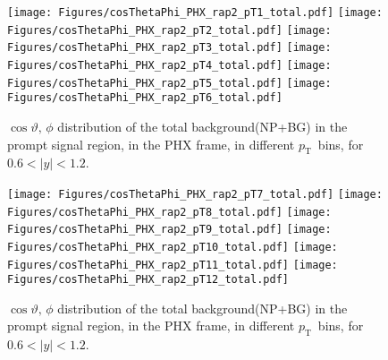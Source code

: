 \documentclass[12pt]{article}
\newcommand{\pt}{$p_{\mathrm{T}}$}
\begin{document}
\begin{figure}[htbp]
\centering
\texttt{[image: Figures/cosThetaPhi\_PHX\_rap2\_pT1\_total.pdf]}
\texttt{[image: Figures/cosThetaPhi\_PHX\_rap2\_pT2\_total.pdf]}
\texttt{[image: Figures/cosThetaPhi\_PHX\_rap2\_pT3\_total.pdf]}
\texttt{[image: Figures/cosThetaPhi\_PHX\_rap2\_pT4\_total.pdf]}
\texttt{[image: Figures/cosThetaPhi\_PHX\_rap2\_pT5\_total.pdf]}
\texttt{[image: Figures/cosThetaPhi\_PHX\_rap2\_pT6\_total.pdf]}
\caption{$\cos\vartheta,\,\phi$ distribution of the total background(NP+BG) in the prompt signal region, 
	in the PHX frame, in different \pt\ bins, for $0.6 < |y| < 1.2$.}
\end{figure}
\clearpage

\begin{figure}[htbp]
\centering
\texttt{[image: Figures/cosThetaPhi\_PHX\_rap2\_pT7\_total.pdf]}
\texttt{[image: Figures/cosThetaPhi\_PHX\_rap2\_pT8\_total.pdf]}
\texttt{[image: Figures/cosThetaPhi\_PHX\_rap2\_pT9\_total.pdf]}
\texttt{[image: Figures/cosThetaPhi\_PHX\_rap2\_pT10\_total.pdf]}
\texttt{[image: Figures/cosThetaPhi\_PHX\_rap2\_pT11\_total.pdf]}
\texttt{[image: Figures/cosThetaPhi\_PHX\_rap2\_pT12\_total.pdf]}
\caption{$\cos\vartheta,\,\phi$ distribution of the total background(NP+BG) in the prompt signal region, 
	in the PHX frame, in different \pt\ bins, for $0.6 < |y| < 1.2$.}
\end{figure}
\clearpage
\end{document}
